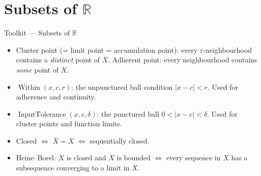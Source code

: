 \section{\texorpdfstring{Subsets of $\mathbb{R}$}{Subsets of R}}

\begin{toolkitbox}{Toolkit --- Subsets of $\mathbb{R}$}
\begin{itemize}
  \item Cluster point (= limit point = accumulation point): every
    $\varepsilon$-neighbourhood contains a \emph{distinct} point of $X$.
    Adherent point: every neighbourhood contains \emph{some} point of $X$.
  \item $\operatorname{Within}(x,c,r)$: the unpunctured ball condition
    $|x-c| < r$. Used for adherence and continuity.
  \item $\operatorname{InputTolerance}(x,c,\delta)$: the punctured ball
    $0 < |x-c| < \delta$. Used for cluster points and function limits.
  \item Closed $\iff$ $\overline{X} = X$ $\iff$ sequentially closed.
  \item Heine--Borel: $X\text{ is closed}$ and
    $X\text{ is bounded}$ $\iff$ every sequence in $X$ has a
    subsequence converging to a limit in $X$.
\end{itemize}
\end{toolkitbox}


